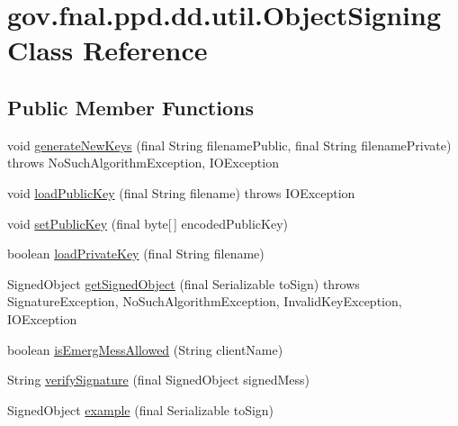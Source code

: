 \hypertarget{classgov_1_1fnal_1_1ppd_1_1dd_1_1util_1_1ObjectSigning}{\section{gov.\-fnal.\-ppd.\-dd.\-util.\-Object\-Signing Class Reference}
\label{classgov_1_1fnal_1_1ppd_1_1dd_1_1util_1_1ObjectSigning}
}
\subsection*{Public Member Functions}
\begin{DoxyCompactItemize}
\item 
void \hyperlink{classgov_1_1fnal_1_1ppd_1_1dd_1_1util_1_1ObjectSigning_afef17fffa3e013d7d7ec8fee9fe0f2ed}{generate\-New\-Keys} (final String filename\-Public, final String filename\-Private)  throws No\-Such\-Algorithm\-Exception, I\-O\-Exception 
\item 
void \hyperlink{classgov_1_1fnal_1_1ppd_1_1dd_1_1util_1_1ObjectSigning_a2df2836d06a9ef91552a6db2ebbf87e6}{load\-Public\-Key} (final String filename)  throws I\-O\-Exception 
\item 
void \hyperlink{classgov_1_1fnal_1_1ppd_1_1dd_1_1util_1_1ObjectSigning_acf35be23ecc6a1591a840068631b5b9e}{set\-Public\-Key} (final byte\mbox{[}$\,$\mbox{]} encoded\-Public\-Key)
\item 
boolean \hyperlink{classgov_1_1fnal_1_1ppd_1_1dd_1_1util_1_1ObjectSigning_ab47b8df330642615c9e958f6e4113f91}{load\-Private\-Key} (final String filename)
\item 
Signed\-Object \hyperlink{classgov_1_1fnal_1_1ppd_1_1dd_1_1util_1_1ObjectSigning_a48cb87cad1109a678fb523ba9f14796d}{get\-Signed\-Object} (final Serializable to\-Sign)  throws Signature\-Exception, No\-Such\-Algorithm\-Exception, Invalid\-Key\-Exception, I\-O\-Exception 
\item 
boolean \hyperlink{classgov_1_1fnal_1_1ppd_1_1dd_1_1util_1_1ObjectSigning_a790a4a0aa418fe54e68a1322a48474cb}{is\-Emerg\-Mess\-Allowed} (String client\-Name)
\item 
String \hyperlink{classgov_1_1fnal_1_1ppd_1_1dd_1_1util_1_1ObjectSigning_a885ae8c325f4509babcda28d0b3019fb}{verify\-Signature} (final Signed\-Object signed\-Mess)
\item 
Signed\-Object \hyperlink{classgov_1_1fnal_1_1ppd_1_1dd_1_1util_1_1ObjectSigning_a9057227b05218ec23f3d91bb35dfda59}{example} (final Serializable to\-Sign)
\end{DoxyCompactItemize}

